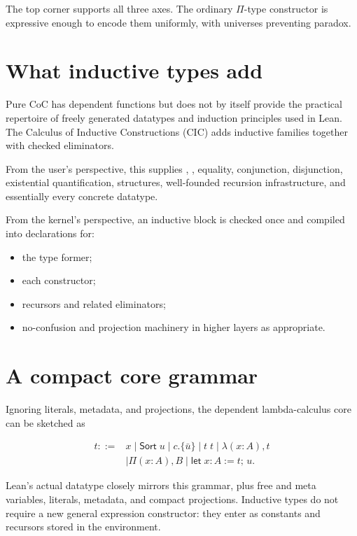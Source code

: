 \documentclass[10pt,letterpaper,oneside,openany]{report}
\newcommand{\term}[1]{\texttt{\detokenize{#1}}}
\begin{document}
The top corner supports all three axes.  The ordinary $\Pi$-type constructor is expressive enough to encode them uniformly, with universes preventing paradox.

\section{What inductive types add}

Pure CoC has dependent functions but does not by itself provide the practical repertoire of freely generated datatypes and induction principles used in Lean.  The Calculus of Inductive Constructions (CIC) adds inductive families together with checked eliminators.

From the user's perspective, this supplies \term{Nat}, \term{List}, equality, conjunction, disjunction, existential quantification, structures, well-founded recursion infrastructure, and essentially every concrete datatype.

From the kernel's perspective, an inductive block is checked once and compiled into declarations for:

\begin{itemize}
\item the type former;
\item each constructor;
\item recursors and related eliminators;
\item no-confusion and projection machinery in higher layers as appropriate.
\end{itemize}

\section{A compact core grammar}

Ignoring literals, metadata, and projections, the dependent lambda-calculus core can be sketched as

\[
\begin{aligned}
t ::= {}& x
\mid \mathsf{Sort}\;u
\mid c.\{\bar u\}
\mid t\;t
\mid \lambda(x:A),t\\
&\mid \Pi(x:A),B
\mid \mathsf{let}\;x:A:=t;\,u.
\end{aligned}
\]

Lean's actual \term{Expr} datatype closely mirrors this grammar, plus free and meta variables, literals, metadata, and compact projections.  Inductive types do not require a new general expression constructor: they enter as constants and recursors stored in the environment.
\end{document}
